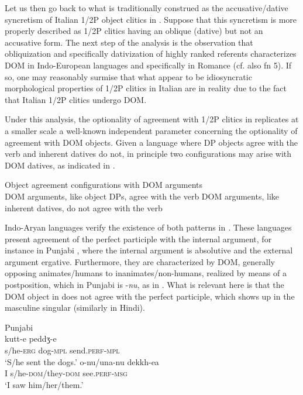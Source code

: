 \documentclass[output=paper,colorlinks,citecolor=brown]{./langscibook}
\begin{document}
Let us then go back to what is traditionally construed as the accusative/dative syncretism of Italian 1/2P object clitics in .  Suppose that this syncretism is more properly described as 1/2P clitics having an oblique (dative) but not an accusative form. The next step of the analysis is the observation that obliquization and specifically dativization of highly ranked referents characterizes DOM in Indo-European languages and specifically in Romance (cf. also fn 5).  If so, one may reasonably surmise that what appear to be idiosyncratic morphological properties of 1/2P clitics in Italian are in reality due to the fact that Italian 1/2P clitics undergo DOM. 

Under this analysis, the optionality of agreement with 1/2P clitics in  replicates at a smaller scale a well-known independent parameter concerning the optionality of agreement with DOM objects. Given a language where DP objects agree with the verb and inherent datives do not, in principle two configurations may arise with DOM datives, as indicated in .

\ea%
    \label{ex:manzini:17}
    Object agreement configurations with DOM arguments \\
    \ea\label{ex:manzini:17a} 
    DOM arguments, like object DPs, agree with the verb
    \ex\label{ex:manzini:17b} 
    DOM arguments, like inherent datives, do not agree with the verb
    \z
\z

Indo-Aryan languages verify the existence of both patterns in \emph{.} These languages present agreement of the perfect participle with the internal argument, for instance in Punjabi , where the internal argument is absolutive and the external argument ergative. Furthermore, they are characterized by DOM, generally opposing animates/humans to inanimates/non-humans, realized by means of a postposition, which in Punjabi is -\textit{nu}, as in . What is relevant here is that the DOM object in  does not agree with the perfect participle, which shows up in the masculine singular (similarly in Hindi).

\ea%
    \label{ex:manzini:18}
    Punjabi \citep{ManziniSavoiaFranco2015}\\
    \ea\label{ex:manzini:18a} 
         {kutt-e}     {peddʒ-e}\\
        s/he-\textsc{erg}   dog-\textsc{mpl}   send.\textsc{perf-mpl}\\
    \glt ‘S/he sent the dogs.’  
    \ex\label{ex:manzini:18b} 
       {o-nu/una-nu}       {dekkh-ea}\\
        I   s/he\textsc{{}-dom}/they\textsc{{}-dom}    see.\textsc{perf-msg}\\
    \glt ‘I saw him/her/them.’
    \z 
\z 
\end{document}
